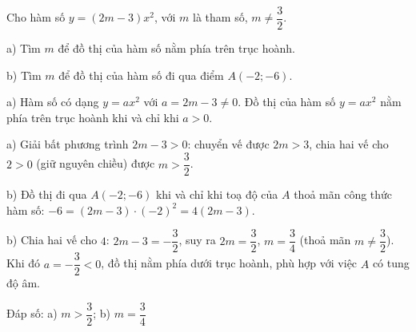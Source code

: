 \begin{problem}[9DS-HSB2-012]
Cho hàm số $y = (2m - 3)x^2$, với $m$ là tham số, $m \neq \dfrac{3}{2}$.

a) Tìm $m$ để đồ thị của hàm số nằm phía trên trục hoành.

b) Tìm $m$ để đồ thị của hàm số đi qua điểm $A(-2; -6)$.

\begin{solution}
a) Hàm số có dạng $y = ax^2$ với $a = 2m - 3 \neq 0$. Đồ thị của hàm số $y = ax^2$ nằm phía trên trục hoành khi và chỉ khi $a > 0$.

a) Giải bất phương trình $2m - 3 > 0$: chuyển vế được $2m > 3$, chia hai vế cho $2 > 0$ (giữ nguyên chiều) được $m > \dfrac{3}{2}$.

b) Đồ thị đi qua $A(-2; -6)$ khi và chỉ khi toạ độ của $A$ thoả mãn công thức hàm số: $-6 = (2m - 3) \cdot (-2)^2 = 4(2m - 3)$.

b) Chia hai vế cho $4$: $2m - 3 = -\dfrac{3}{2}$, suy ra $2m = \dfrac{3}{2}$, $m = \dfrac{3}{4}$ (thoả mãn $m \neq \dfrac{3}{2}$). Khi đó $a = -\dfrac{3}{2} < 0$, đồ thị nằm phía dưới trục hoành, phù hợp với việc $A$ có tung độ âm.

Đáp số: a) $\boxed{m > \dfrac{3}{2}}$; b) $\boxed{m = \dfrac{3}{4}}$
\end{solution}
\end{problem}

